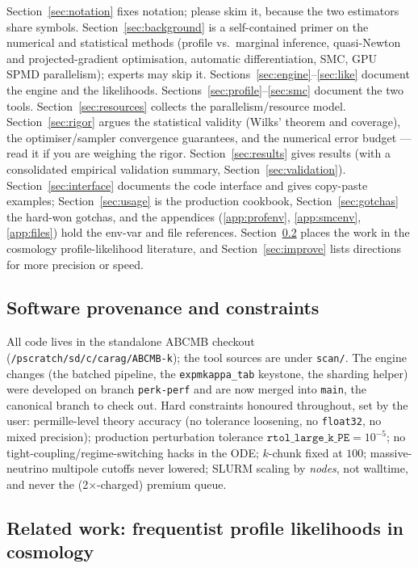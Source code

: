 \documentclass[11pt]{article}
\newcommand{\code}[1]{\texttt{\small #1}}
\newcommand{\file}[1]{\texttt{\small #1}}
\begin{document}
Section~\ref{sec:notation} fixes notation; please skim it, because the
two estimators share symbols. Section~\ref{sec:background} is a
self-contained primer on the numerical and statistical methods (profile
vs.\ marginal inference, quasi-Newton and projected-gradient optimisation,
automatic differentiation, SMC, GPU SPMD parallelism); experts may skip
it. Sections~\ref{sec:engine}--\ref{sec:like} document the engine and the
likelihoods. Sections~\ref{sec:profile}--\ref{sec:smc} document the two
tools. Section~\ref{sec:resources} collects the parallelism/resource
model. Section~\ref{sec:rigor} argues the statistical validity (Wilks'
theorem and coverage), the optimiser/sampler convergence guarantees, and
the numerical error budget --- read it if you are weighing the rigor.
Section~\ref{sec:results} gives results (with a consolidated empirical
validation summary, Section~\ref{sec:validation}).
Section~\ref{sec:interface} documents the code interface and gives
copy-paste examples; Section~\ref{sec:usage} is the production cookbook,
Section~\ref{sec:gotchas} the hard-won gotchas, and the appendices
(\ref{app:profenv}, \ref{app:smcenv}, \ref{app:files}) hold the env-var
and file references. Section~\ref{sec:relatedwork} places the work in the
cosmology profile-likelihood literature, and
Section~\ref{sec:improve} lists directions for more precision or speed.

\subsection{Software provenance and constraints}
\label{sec:provenance}

All code lives in the standalone \textsc{ABCMB} checkout
(\file{/pscratch/sd/c/carag/ABCMB-k}); the tool sources are under
\file{scan/}. The engine changes (the batched pipeline, the
\code{expmkappa\_tab} keystone, the sharding helper) were developed on
branch \code{perk-perf} and are now merged into \code{main}, the canonical
branch to check out. Hard constraints honoured throughout, set by the user:
permille-level theory accuracy (no tolerance loosening, no \code{float32},
no mixed precision); production perturbation tolerance
$\mathtt{rtol\_large\_k\_PE}=10^{-5}$; no tight-coupling/regime-switching
hacks in the ODE; $k$-chunk fixed at $100$; massive-neutrino multipole
cutoffs never lowered; SLURM scaling by \emph{nodes}, not walltime, and
never the (2$\times$-charged) premium queue.

\subsection{Related work: frequentist profile likelihoods in cosmology}
\label{sec:relatedwork}
\end{document}
